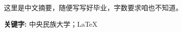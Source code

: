 
\begin{cnabstract}
    这里是中文摘要，随便写写好毕业，字数要求咱也不知道。
    
    \noindent\textbf{关键字: } 中央民族大学；\LaTeX

\end{cnabstract}


